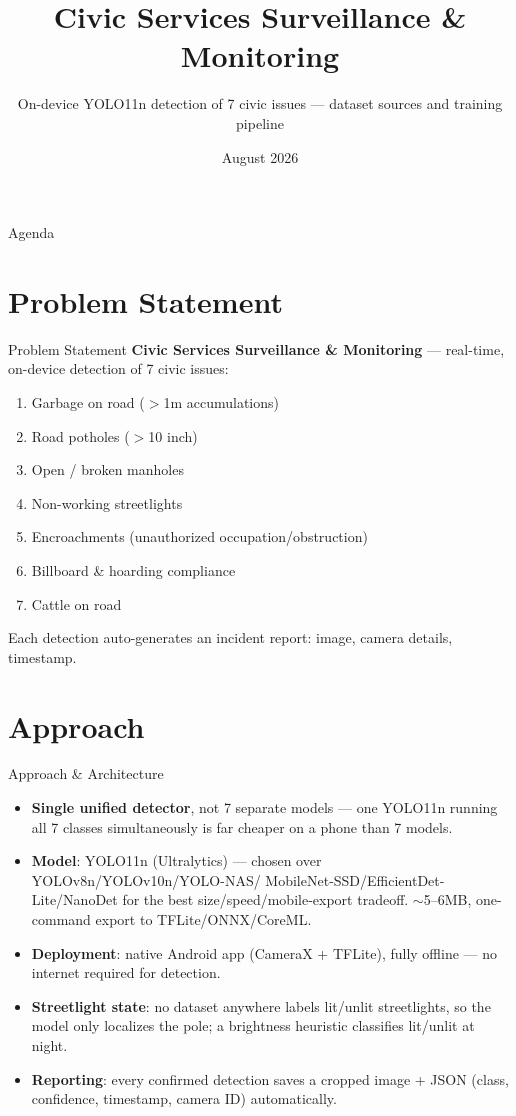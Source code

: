 \documentclass[10pt]{beamer}
\title[Civic Services Monitoring]{Civic Services Surveillance \& Monitoring}
\subtitle{On-device YOLO11n detection of 7 civic issues — dataset sources and training pipeline}
\author{}
\institute{}
\date{August 2026}
\begin{document}
\begin{frame}
  \titlepage
\end{frame}

\begin{frame}{Agenda}
  \tableofcontents
\end{frame}

\section{Problem Statement}
\begin{frame}{Problem Statement}
  \textbf{Civic Services Surveillance \& Monitoring} — real-time, on-device detection of 7 civic issues:
  \begin{enumerate}
    \item Garbage on road ($>$1m accumulations)
    \item Road potholes ($>$10 inch)
    \item Open / broken manholes
    \item Non-working streetlights
    \item Encroachments (unauthorized occupation/obstruction)
    \item Billboard \& hoarding compliance
    \item Cattle on road
  \end{enumerate}
  Each detection auto-generates an incident report: image, camera details, timestamp.
\end{frame}

\section{Approach}
\begin{frame}{Approach \& Architecture}
  \begin{itemize}
    \item \textbf{Single unified detector}, not 7 separate models — one YOLO11n running all 7
      classes simultaneously is far cheaper on a phone than 7 models.
    \item \textbf{Model}: YOLO11n (Ultralytics) — chosen over YOLOv8n/YOLOv10n/YOLO-NAS/
      MobileNet-SSD/EfficientDet-Lite/NanoDet for the best size/speed/mobile-export tradeoff.
      $\sim$5--6MB, one-command export to TFLite/ONNX/CoreML.
    \item \textbf{Deployment}: native Android app (CameraX + TFLite), fully offline —
      no internet required for detection.
    \item \textbf{Streetlight state}: no dataset anywhere labels lit/unlit streetlights, so
      the model only localizes the pole; a brightness heuristic classifies lit/unlit at night.
    \item \textbf{Reporting}: every confirmed detection saves a cropped image + JSON
      (class, confidence, timestamp, camera ID) automatically.
  \end{itemize}
\end{frame}
\end{document}
